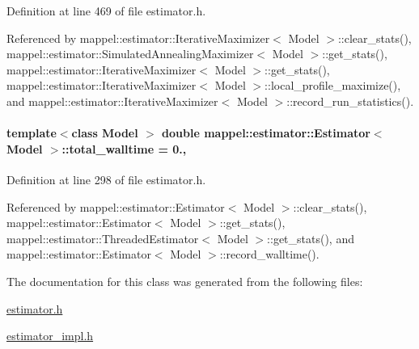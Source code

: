 Definition at line 469 of file estimator.\+h.



Referenced by mappel\+::estimator\+::\+Iterative\+Maximizer$<$ Model $>$\+::clear\+\_\+stats(), mappel\+::estimator\+::\+Simulated\+Annealing\+Maximizer$<$ Model $>$\+::get\+\_\+stats(), mappel\+::estimator\+::\+Iterative\+Maximizer$<$ Model $>$\+::get\+\_\+stats(), mappel\+::estimator\+::\+Iterative\+Maximizer$<$ Model $>$\+::local\+\_\+profile\+\_\+maximize(), and mappel\+::estimator\+::\+Iterative\+Maximizer$<$ Model $>$\+::record\+\_\+run\+\_\+statistics().

\paragraph[{\texorpdfstring{total\+\_\+walltime}{total_walltime}}]{\setlength{\rightskip}{0pt plus 5cm}template$<$class Model $>$ double {\bf mappel\+::estimator\+::\+Estimator}$<$ Model $>$\+::total\+\_\+walltime = 0.\hspace{0.3cm}{\ttfamily [protected]}, {\ttfamily [inherited]}}\hypertarget{classmappel_1_1estimator_1_1Estimator_a98ad459e850aeb2c42c10fd06c3b9fbc}{}\label{classmappel_1_1estimator_1_1Estimator_a98ad459e850aeb2c42c10fd06c3b9fbc}


Definition at line 298 of file estimator.\+h.



Referenced by mappel\+::estimator\+::\+Estimator$<$ Model $>$\+::clear\+\_\+stats(), mappel\+::estimator\+::\+Estimator$<$ Model $>$\+::get\+\_\+stats(), mappel\+::estimator\+::\+Threaded\+Estimator$<$ Model $>$\+::get\+\_\+stats(), and mappel\+::estimator\+::\+Estimator$<$ Model $>$\+::record\+\_\+walltime().



The documentation for this class was generated from the following files\+:\begin{DoxyCompactItemize}
\item 
\hyperlink{estimator_8h}{estimator.\+h}\item 
\hyperlink{estimator__impl_8h}{estimator\+\_\+impl.\+h}\end{DoxyCompactItemize}
